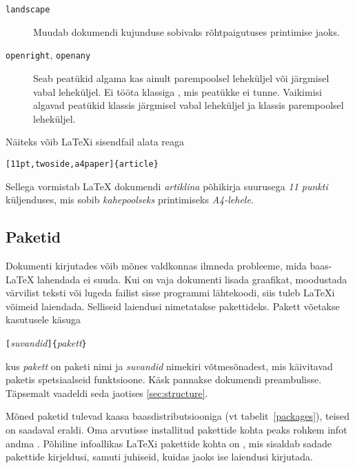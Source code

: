 {\begin{table}[tp]
\begin{lined}{\textwidth}
\begin{description}
\item[\normalfont\texttt{landscape}] \quad Muudab dokumendi kujunduse
  sobivaks rõhtpaigutuses printimise jaoks.

\item[\normalfont\texttt{openright}, \texttt{openany}] \quad Seab peatükid algama
  kas ainult parempoolsel leheküljel või järgmisel vabal leheküljel. Ei
  tööta klassiga , mis peatükke ei tunne. Vaikimisi
  algavad peatükid klassis  järgmisel vabal leheküljel ja
  klassis  parempoolsel leheküljel.

\end{description}
\end{lined}
\end{table}

Näiteks võib \LaTeX i sisendfail alata reaga
\begin{code}
\verb|[11pt,twoside,a4paper]{article}|
\end{code}
Sellega vormistab \LaTeX{} dokumendi \emph{artiklina} põhikirja
suurusega \emph{11 punkti} küljenduses, mis sobib
\emph{kahepoolseks} printimiseks \emph{A4-lehele}.

\subsection{Paketid}
Dokumenti kirjutades võib mõnes valdkonnas ilmneda
probleeme, mida baas-\LaTeX{} lahendada ei suuda. Kui on vaja dokumenti
lisada graafikat, moodustada värvilist teksti või lugeda failist sisse
programmi lähtekoodi, siis tuleb \LaTeX i võimeid laiendada. Selliseid
laiendusi nimetatakse pakettideks. Pakett võetakse kasutusele käsuga
\begin{lscommand}
\verb|[|\emph{suvandid}\verb|]{|\emph{pakett}\verb|}|
\end{lscommand}
\noindent kus \emph{pakett} on paketi nimi ja \emph{suvandid} nimekiri
võtmesõnadest, mis käivitavad paketis spetsiaalseid funktsioone. Käsk
 pannakse dokumendi preambulisse. Täpsemalt vaadeldi seda
jaotises \ref{sec:structure}.

Mõned paketid tulevad kaasa \LaTeXe{} baasdistributsiooniga (vt
tabelit~\ref{packages}), teised on saadaval eraldi. Oma arvutisse
installitud pakettide kohta peaks rohkem infot andma \guide. Põhiline
infoallikas \LaTeX i pakettide kohta on \companion, mis sisaldab sadade
pakettide kirjeldusi, samuti juhiseid, kuidas \LaTeXe{} jaoks ise
laiendusi kirjutada.

}
